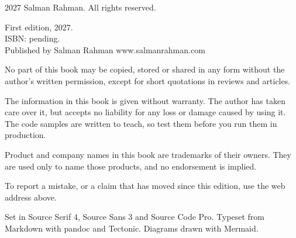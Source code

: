 %
%
%
%

\thispagestyle{empty}
\vspace*{\fill}

{\fontsize{\tokSmallSize}{12pt}\selectfont\color{ink}
\setlength{\parskip}{3mm}\raggedright

\textcopyright{} 2027 Salman Rahman. All rights reserved.

First edition, 2027.\\
ISBN: pending.\\
Published by Salman Rahman \textperiodcentered{} www.salmanrahman.com

No part of this book may be copied, stored or shared in any form without the author's written
permission, except for short quotations in reviews and articles.

The information in this book is given without warranty. The author has taken care over it, but
accepts no liability for any loss or damage caused by using it. The code samples are written to
teach, so test them before you run them in production.

Product and company names in this book are trademarks of their owners. They are used only to
name those products, and no endorsement is implied.

To report a mistake, or a claim that has moved since this edition, use the web address above.

{\color{inkmid}Set in Source Serif 4, Source Sans 3 and Source Code Pro. Typeset from Markdown with
pandoc and Tectonic. Diagrams drawn with Mermaid.}\par}

\clearpage
